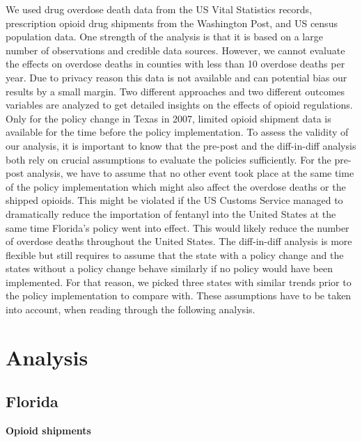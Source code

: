\documentclass[12pt,letterpaper]{article}
\begin{document}
We used drug overdose death data from the US Vital Statistics records, prescription opioid drug shipments from the Washington Post, and US census population data. One strength of the analysis is that it is based on a large number of observations and credible data sources. However, we cannot evaluate the effects on overdose deaths in counties with less than 10 overdose deaths per year. Due to privacy reason this data is not available and can potential bias our results by a small margin. Two different approaches and two different outcomes variables are analyzed to get detailed insights on the effects of opioid regulations. Only for the policy change in Texas in 2007, limited opioid shipment data is available for the time before the policy implementation. To assess the validity of our analysis, it is important to know that the pre-post and the diff-in-diff analysis both rely on crucial assumptions to evaluate the policies sufficiently. For the pre-post analysis, we have to assume that no other event took place at the same time of the policy implementation which might also affect the overdose deaths or the shipped opioids. This might be violated if the US Customs Service managed to dramatically reduce the importation of fentanyl into the United States at the same time Florida's policy went into effect. This would likely reduce the number of overdose deaths throughout the United States. The diff-in-diff analysis is more flexible but still requires to assume that the state with a policy change and the states without a policy change behave similarly if no policy would have been implemented. For that reason, we picked three states with similar trends prior to the policy implementation to compare with. These assumptions have to be taken into account, when reading through the following analysis. 

\section{Analysis}
\subsection{Florida}

\textbf{Opioid shipments}
\end{document}
